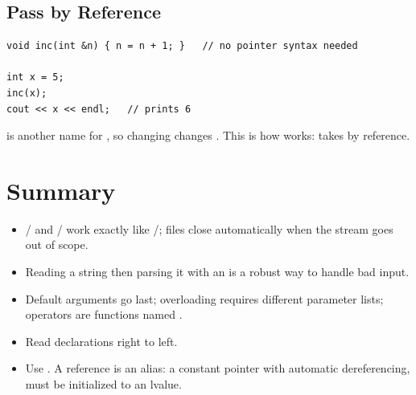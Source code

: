 \subsection{Pass by Reference}
\begin{lstlisting}[style=cpp]
void inc(int &n) { n = n + 1; }   // no pointer syntax needed

int x = 5;
inc(x);
cout << x << endl;   // prints 6
\end{lstlisting}
 is another name for , so changing  changes .
This is how  works:  takes  by
reference.

\section*{Summary}
\begin{itemize}
  \item {}/ and /
        work exactly like /; files close automatically when
        the stream goes out of scope.
  \item Reading a string then parsing it with an  is a
        robust way to handle bad input.
  \item Default arguments go last; overloading requires different parameter
        lists; operators are functions named .
  \item Read  declarations right to left.
  \item Use . A reference is an alias: a constant pointer with
        automatic dereferencing, must be initialized to an lvalue.
\end{itemize}
